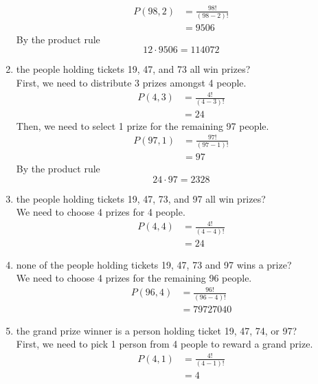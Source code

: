 \documentclass[a4paper]{article}
\begin{document}
\begin{enumerate}[label = \textbf{\alph*)}]
\begin{align*}
		      P(98,2) & = \frac{98!}{(98-2)!} \\
		              & = 9506
	      \end{align*}
	      By the product rule
	      \begin{equation*}
		      12 \cdot 9506 = 114072
	      \end{equation*}
	\item the people holding tickets 19, 47, and 73 all win prizes? \\
	      First, we need to distribute 3 prizes amongst 4 people.
	      \begin{align*}
		      P(4,3) & = \frac{4!}{(4-3)!} \\
		             & = 24 
	      \end{align*}
	      Then, we need to select 1 prize for the remaining 97 people.
	      \begin{align*}
		      P(97,1) & = \frac{97!}{(97-1)!} \\
		              & = 97
	      \end{align*}
	      By the product rule
	      \begin{equation*}
		      24 \cdot 97 = 2328
	      \end{equation*}
	\item the people holding tickets 19, 47, 73, and 97 all win prizes? \\
	      We need to choose 4 prizes for 4 people.
	      \begin{align*}
		      P(4,4) & = \frac{4!}{(4-4)!} \\
		             & = 24
	      \end{align*}
	\item none of the people holding tickets 19, 47, 73 and 97 wins a prize? \\
	      We need to choose 4 prizes for the remaining 96 people.
	      \begin{align*}
		      P(96,4) & = \frac{96!}{(96-4)!} \\
		              & = 79727040
	      \end{align*}
	\item the grand prize winner is a person holding ticket 19, 47, 74, or 97? \\
	      First, we need to pick 1 person from 4 people to reward a grand prize.
	      \begin{align*}
		      P(4,1) & = \frac{4!}{(4-1)!} \\
		             & = 4
	      \end{align*}

\end{enumerate}
\end{document}
